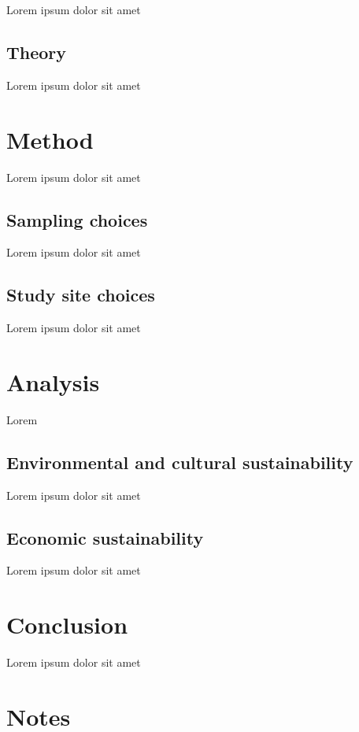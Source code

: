 \documentclass[11pt,letterpaper]{article}
\begin{document}
Lorem ipsum dolor sit amet

\subsection{Theory}

Lorem ipsum dolor sit amet

\section{Method}

Lorem ipsum dolor sit amet

\subsection{Sampling choices}

Lorem ipsum dolor sit amet

\subsection{Study site choices}

Lorem ipsum dolor sit amet


\section{Analysis}

Lorem

\subsection{Environmental and cultural sustainability}
Lorem ipsum dolor sit amet

\subsection{Economic sustainability}
Lorem ipsum dolor sit amet

\section{Conclusion}

Lorem ipsum dolor sit amet

\newpage
{}


\section*{Notes}
\label{sec:notes}
\end{document}
